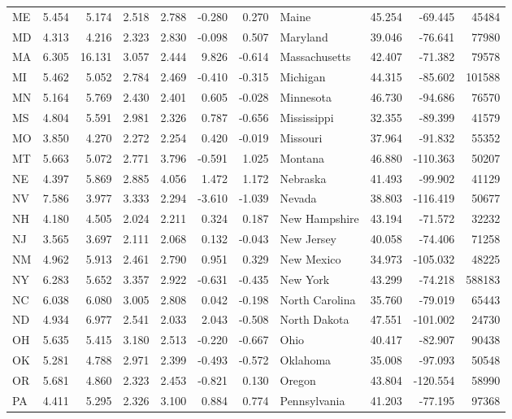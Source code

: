 \begin{tabular}{lrrrrrrlrrr}
ME & 5.454 & 5.174 & 2.518 & 2.788 & -0.280 & 0.270 & Maine & 45.254 & -69.445 & 45484 \\
MD & 4.313 & 4.216 & 2.323 & 2.830 & -0.098 & 0.507 & Maryland & 39.046 & -76.641 & 77980 \\
MA & 6.305 & 16.131 & 3.057 & 2.444 & 9.826 & -0.614 & Massachusetts & 42.407 & -71.382 & 79578 \\
MI & 5.462 & 5.052 & 2.784 & 2.469 & -0.410 & -0.315 & Michigan & 44.315 & -85.602 & 101588 \\
MN & 5.164 & 5.769 & 2.430 & 2.401 & 0.605 & -0.028 & Minnesota & 46.730 & -94.686 & 76570 \\
MS & 4.804 & 5.591 & 2.981 & 2.326 & 0.787 & -0.656 & Mississippi & 32.355 & -89.399 & 41579 \\
MO & 3.850 & 4.270 & 2.272 & 2.254 & 0.420 & -0.019 & Missouri & 37.964 & -91.832 & 55352 \\
MT & 5.663 & 5.072 & 2.771 & 3.796 & -0.591 & 1.025 & Montana & 46.880 & -110.363 & 50207 \\
NE & 4.397 & 5.869 & 2.885 & 4.056 & 1.472 & 1.172 & Nebraska & 41.493 & -99.902 & 41129 \\
NV & 7.586 & 3.977 & 3.333 & 2.294 & -3.610 & -1.039 & Nevada & 38.803 & -116.419 & 50677 \\
NH & 4.180 & 4.505 & 2.024 & 2.211 & 0.324 & 0.187 & New Hampshire & 43.194 & -71.572 & 32232 \\
NJ & 3.565 & 3.697 & 2.111 & 2.068 & 0.132 & -0.043 & New Jersey & 40.058 & -74.406 & 71258 \\
NM & 4.962 & 5.913 & 2.461 & 2.790 & 0.951 & 0.329 & New Mexico & 34.973 & -105.032 & 48225 \\
NY & 6.283 & 5.652 & 3.357 & 2.922 & -0.631 & -0.435 & New York & 43.299 & -74.218 & 588183 \\
NC & 6.038 & 6.080 & 3.005 & 2.808 & 0.042 & -0.198 & North Carolina & 35.760 & -79.019 & 65443 \\
ND & 4.934 & 6.977 & 2.541 & 2.033 & 2.043 & -0.508 & North Dakota & 47.551 & -101.002 & 24730 \\
OH & 5.635 & 5.415 & 3.180 & 2.513 & -0.220 & -0.667 & Ohio & 40.417 & -82.907 & 90438 \\
OK & 5.281 & 4.788 & 2.971 & 2.399 & -0.493 & -0.572 & Oklahoma & 35.008 & -97.093 & 50548 \\
OR & 5.681 & 4.860 & 2.323 & 2.453 & -0.821 & 0.130 & Oregon & 43.804 & -120.554 & 58990 \\
PA & 4.411 & 5.295 & 2.326 & 3.100 & 0.884 & 0.774 & Pennsylvania & 41.203 & -77.195 & 97368 \\

\end{tabular}
